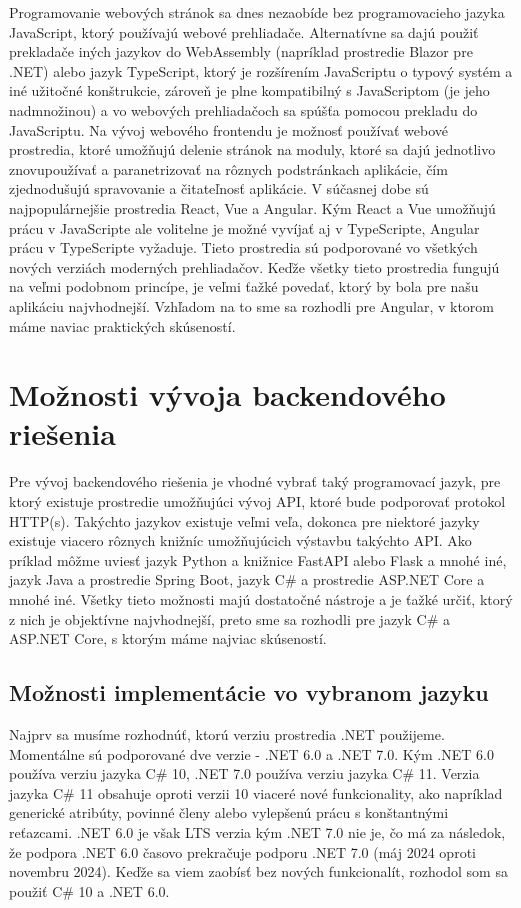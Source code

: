 Programovanie webových stránok sa dnes nezaobíde bez programovacieho jazyka JavaScript, ktorý používajú webové prehliadače. Alternatívne 
sa dajú použiť prekladače iných jazykov do WebAssembly (napríklad prostredie Blazor pre .NET) alebo jazyk TypeScript, ktorý je rozšírením JavaScriptu o typový 
systém a iné užitočné konštrukcie, zároveň je plne kompatibilný s JavaScriptom (je jeho nadmnožinou) a vo webových prehliadačoch sa spúšťa pomocou 
prekladu do JavaScriptu. Na vývoj webového frontendu je možnosť používať webové prostredia, ktoré umožňujú delenie stránok na moduly, 
ktoré sa dajú jednotlivo znovupoužívať a paranetrizovať na rôznych podstránkach aplikácie, čím zjednodušujú spravovanie a čitateľnosť aplikácie. 
V súčasnej dobe sú najpopulárnejšie prostredia React, Vue a Angular. Kým React a Vue umožňujú prácu v JavaScripte ale volitelne je možné vyvíjať 
aj v TypeScripte, Angular prácu v TypeScripte vyžaduje. Tieto prostredia sú podporované vo všetkých nových verziách moderných prehliadačov. 
Keďže všetky tieto prostredia fungujú na veľmi podobnom princípe, je veľmi ťažké povedať, ktorý by bola pre našu aplikáciu najvhodnejší. Vzhľadom 
na to sme sa rozhodli pre Angular, v ktorom máme naviac praktických skúseností.

\section{Možnosti vývoja backendového riešenia}

Pre vývoj backendového riešenia je vhodné vybrať taký programovací jazyk, pre ktorý existuje prostredie umožňujúci vývoj API, ktoré bude podporovať 
protokol HTTP(s). Takýchto jazykov existuje veľmi veľa, dokonca pre niektoré jazyky existuje viacero rôznych knižníc umožňujúcich výstavbu 
takýchto API. Ako príklad môžme uviesť jazyk Python a knižnice FastAPI alebo Flask a mnohé iné, jazyk Java a prostredie Spring Boot, jazyk C\# a 
prostredie ASP.NET Core a mnohé iné. Všetky tieto možnosti majú dostatočné nástroje a je ťažké určiť, ktorý z nich je objektívne najvhodnejší, 
preto sme sa rozhodli pre jazyk C\# a ASP.NET Core, s ktorým máme najviac skúseností.

\subsection{Možnosti implementácie vo vybranom jazyku}

Najprv sa musíme rozhodnúť, ktorú verziu prostredia .NET použijeme. Momentálne sú podporované dve verzie - .NET 6.0 a .NET 7.0. Kým .NET 6.0 
používa verziu jazyka C\# 10, .NET 7.0 používa verziu jazyka C\# 11. Verzia jazyka C\# 11 obsahuje oproti verzii 10 viaceré nové funkcionality,
ako napríklad generické atribúty, povinné členy alebo vylepšenú prácu s konštantnými reťazcami. .NET 6.0 je však LTS verzia kým .NET 7.0 nie je, 
čo má za následok, že podpora .NET 6.0 časovo prekračuje podporu .NET 7.0 (máj 2024 oproti novembru 2024). Keďže sa viem zaobísť bez nových 
funkcionalít, rozhodol som sa použiť C\# 10 a .NET 6.0.

